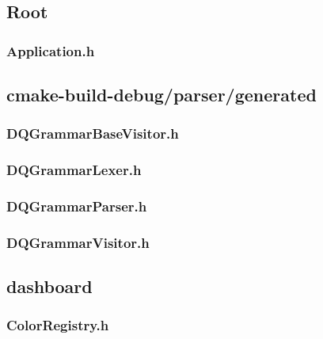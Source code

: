 \subsection*{Root}

\subsubsection*{Application.h}


\subsection*{cmake-build-debug/parser/generated}

\subsubsection*{DQGrammarBaseVisitor.h}


\subsubsection*{DQGrammarLexer.h}


\subsubsection*{DQGrammarParser.h}


\subsubsection*{DQGrammarVisitor.h}


\subsection*{dashboard}

\subsubsection*{ColorRegistry.h}


